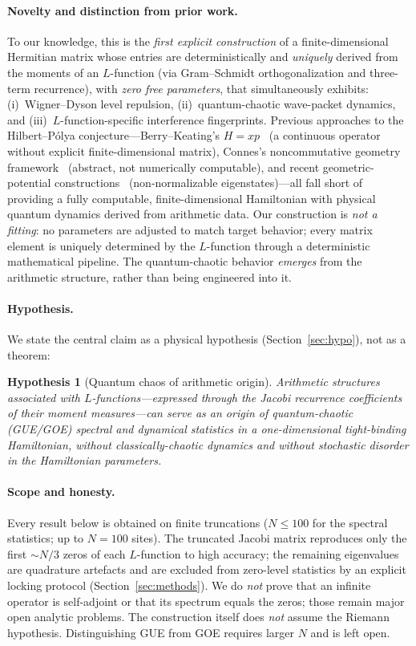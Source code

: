 \documentclass[aps,prx,reprint,floatfix]{revtex4-2}
\newtheorem{hyp}{Hypothesis}
\begin{document}
\paragraph{Novelty and distinction from prior work.}
To our knowledge, this is the \emph{first explicit construction} of a finite-dimensional Hermitian matrix whose entries are deterministically and \emph{uniquely} derived from the moments of an $L$-function (via Gram--Schmidt orthogonalization and three-term recurrence), with \emph{zero free parameters}, that simultaneously exhibits: (i)~Wigner--Dyson level repulsion, (ii)~quantum-chaotic wave-packet dynamics, and (iii)~$L$-function-specific interference fingerprints. Previous approaches to the Hilbert--P\'olya conjecture---Berry--Keating's $H=xp$~\cite{berry1999} (a continuous operator without explicit finite-dimensional matrix), Connes's noncommutative geometry framework~\cite{connes1999} (abstract, not numerically computable), and recent geometric-potential constructions~\cite{suo2025} (non-normalizable eigenstates)---all fall short of providing a fully computable, finite-dimensional Hamiltonian with physical quantum dynamics derived from arithmetic data. Our construction is \emph{not a fitting}: no parameters are adjusted to match target behavior; every matrix element is uniquely determined by the $L$-function through a deterministic mathematical pipeline. The quantum-chaotic behavior \emph{emerges} from the arithmetic structure, rather than being engineered into it.

\paragraph{Hypothesis.}
We state the central claim as a physical hypothesis (Section~\ref{sec:hypo}),
not as a theorem:

\begin{hyp}[Quantum chaos of arithmetic origin]
Arithmetic structures associated with $L$-functions---expressed through the
Jacobi recurrence coefficients of their moment measures---can serve as an
\emph{origin} of quantum-chaotic (GUE/GOE) spectral and dynamical statistics
in a one-dimensional tight-binding Hamiltonian, \emph{without}
classically-chaotic dynamics and \emph{without} stochastic disorder in the
Hamiltonian parameters.
\end{hyp}

\paragraph{Scope and honesty.}
Every result below is obtained on finite truncations ($N\le 100$ for the
spectral statistics; up to $N=100$ sites). The truncated Jacobi matrix
reproduces only the first $\sim N/3$ zeros of each $L$-function to high
accuracy; the remaining eigenvalues are quadrature artefacts and are excluded
from zero-level statistics by an explicit locking protocol
(Section~\ref{sec:methods}). We do \emph{not} prove that an infinite
operator is self-adjoint or that its spectrum equals the zeros; those remain
major open analytic problems. The construction itself does \emph{not} assume
the Riemann hypothesis. Distinguishing GUE from GOE requires larger $N$ and
is left open.
\end{document}

